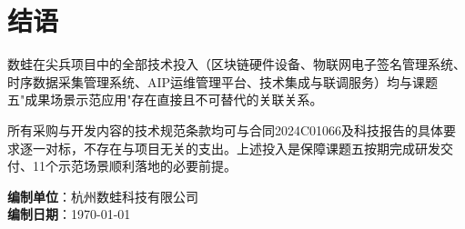 \documentclass[12pt,a4paper]{ctexart}
\begin{document}
\section{结语}

数蛙在尖兵项目中的全部技术投入（区块链硬件设备、物联网电子签名管理系统、时序数据采集管理系统、AIP运维管理平台、技术集成与联调服务）均与课题五"成果场景示范应用"存在直接且不可替代的关联关系。

所有采购与开发内容的技术规范条款均可与合同2024C01066及科技报告的具体要求逐一对标，不存在与项目无关的支出。上述投入是保障课题五按期完成研发交付、11个示范场景顺利落地的必要前提。

\vspace{12pt}
\noindent\textbf{编制单位}：杭州数蛙科技有限公司 \\
\textbf{编制日期}：\today
\end{document}
